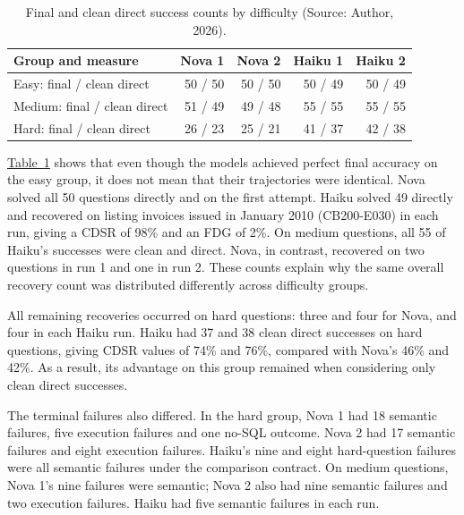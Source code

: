 \begin{table}[H]
\centering
{\small
\setlength{\tabcolsep}{4pt}
\begin{tabularx}{\textwidth}{@{}>{\raggedright\arraybackslash}Xrrrr@{}}
\toprule
\textbf{Group and measure} & \textbf{Nova 1} & \textbf{Nova 2} & \textbf{Haiku 1} & \textbf{Haiku 2} \\
\midrule
Easy: final / clean direct & 50 / 50 & 50 / 50 & 50 / 49 & 50 / 49 \\
\addlinespace[0.4em]
Medium: final / clean direct & 51 / 49 & 49 / 48 & 55 / 55 & 55 / 55 \\
\addlinespace[0.4em]
Hard: final / clean direct & 26 / 23 & 25 / 21 & 41 / 37 & 42 / 38 \\
\bottomrule
\end{tabularx}
}
\caption{Final and clean direct success counts by difficulty (Source: Author, 2026).}
\label{tab:results-difficulty-counts}
\end{table}

\hyperref[tab:results-difficulty-counts]{Table~\ref*{tab:results-difficulty-counts}}
shows that even though the models achieved perfect final accuracy on the easy group, 
it does not mean that their trajectories were identical.
Nova solved all 50 questions directly and on the first attempt. 
Haiku solved 49 directly and recovered on listing invoices issued in January 2010
(CB200-E030) in each run, 
giving a CDSR of 98\% and an FDG of 2\%. 
On medium questions, all 55 of Haiku's successes were clean and direct. 
Nova, in contrast, recovered on two questions in run 1 and one in run 2. 
These counts explain why the same overall recovery
count was distributed differently across difficulty groups.

All remaining recoveries occurred on hard questions: three and four for
Nova, and four in each Haiku run. 
Haiku had 37 and 38 clean direct successes on hard questions, 
giving CDSR values of 74\% and 76\%, compared with Nova's 46\% and 42\%.
As a result, its advantage on this group remained when considering only clean direct successes.

The terminal failures also differed. In the hard group, Nova 1 had
18 semantic failures, five execution failures and one no-SQL outcome.
Nova 2 had 17 semantic failures and eight execution failures.
Haiku's nine and eight hard-question failures were all semantic failures
under the comparison contract. On medium questions, Nova 1's nine failures
were semantic; Nova 2 also had nine semantic failures and two execution failures.
Haiku had five semantic failures in each run.

